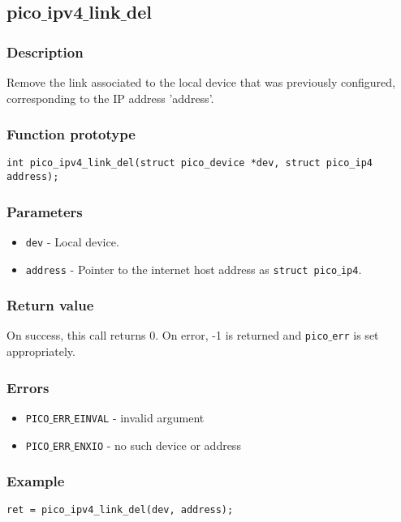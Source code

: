 \subsection{pico$\_$ipv4$\_$link$\_$del}

\subsubsection*{Description}
Remove the link associated to the local device that was previously configured, corresponding to the IP address 'address'.

\subsubsection*{Function prototype}
\begin{verbatim}
int pico_ipv4_link_del(struct pico_device *dev, struct pico_ip4 address); 
\end{verbatim}

\subsubsection*{Parameters}
\begin{itemize}[noitemsep]
\item \texttt{dev} - Local device.
\item \texttt{address} - Pointer to the internet host address as \texttt{struct pico$\_$ip4}.
\end{itemize}

\subsubsection*{Return value}
On success, this call returns 0.
On error, -1 is returned and \texttt{pico$\_$err} is set appropriately.

\subsubsection*{Errors}
\begin{itemize}[noitemsep]
\item \texttt{PICO$\_$ERR$\_$EINVAL} - invalid argument
\item \texttt{PICO$\_$ERR$\_$ENXIO} - no such device or address
\end{itemize}

\subsubsection*{Example}
\begin{verbatim}
ret = pico_ipv4_link_del(dev, address);
\end{verbatim}



